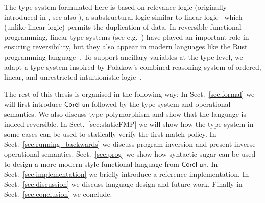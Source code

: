 \documentclass[a4paper,10p,openright]{memoir}
\def\rfunc{\ensuremath{\mathsf{CoreFun}}\xspace}
\begin{document}

The type system formulated here is based on relevance logic (originally
introduced in \cite{Anderson:1975}, see also \cite{Dunn:2002}), a substructural
logic similar to linear logic~\cite{Girard:1987,Wadler:1990} which (unlike
linear logic) permits the duplication of data. In reversible functional
programming, linear type systems (see e.g.~\cite{JamesSabry:2014:RC}) have
played an important role in ensuring reversibility, but they also appear in
modern languages like the Rust programming language~\cite{Matsakis:2014}. To
support ancillary variables at the type level, we adapt a type system inspired
by Polakow's combined reasoning system of ordered, linear, and unrestricted
intuitionistic logic~\cite{Polakow:2001}.

The rest of this thesis is organised in the following way: In
Sect.~\ref{sec:formal} we will first introduce \rfunc followed by the type
system and operational semantics. We also discuss type polymorphism and show
that the language is indeed reversible. In Sect.~\ref{sec:staticFMP} we will
show how the type system in some cases can be used to statically verify the
first match policy. In Sect.~\ref{sec:running_backwards} we discuss program
inversion and present inverse operational semantics. Sect.~\ref{sec:prog} we
show how syntactic sugar can be used to design a more modern style functional
language from \rfunc. In Sect.~\ref{sec:implementation} we briefly introduce a
reference implementation. In Sect.~\ref{sec:discussion} we discuss language
design and future work. Finally in Sect.~\ref{sec:conclusion} we conclude.










\end{document}
